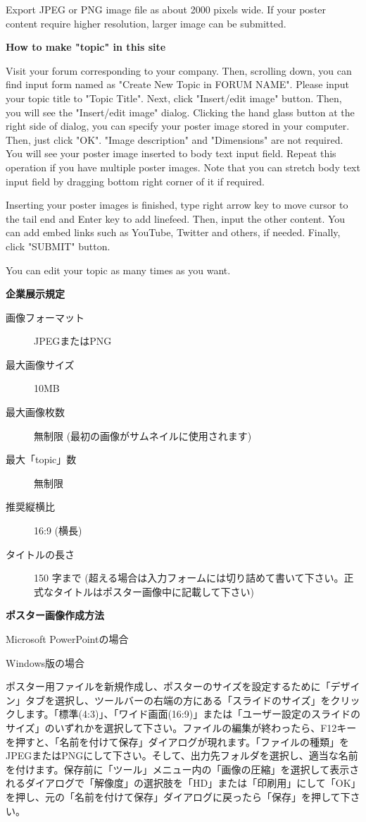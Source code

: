 \documentclass[titlepage,10pt,a4paper,uplatex]{jsbook}
\newenvironment{content}{\begin{shaded}\vspace{-1em}\raggedright\ttfamily\footnotesize\setlength{\baselineskip}{1.4em}}{\end{shaded}\vspace{-1em}}
\renewcommand{\textbf}[1]{{\bfseries\sffamily#1}}
\begin{document}
\begin{content}
Export JPEG or PNG image file as about 2000 pixels wide. If your poster content require higher resolution, larger image can be submitted.

\textbf{\Large How to make "topic" in this site}

Visit your forum corresponding to your company. Then, scrolling down, you can find input form named as "Create New Topic in FORUM NAME". Please input your topic title to "Topic Title". Next, click "Insert/edit image" button. Then, you will see the "Insert/edit image" dialog. Clicking the hand glass button at the right side of dialog, you can specify your poster image stored in your computer. Then, just click "OK". "Image description" and "Dimensions" are not required. You will see your poster image inserted to body text input field. Repeat this operation if you have multiple poster images. Note that you can stretch body text input field by dragging bottom right corner of it if required.

Inserting your poster images is finished, type right arrow key to move cursor to the tail end and Enter key to add linefeed. Then, input the other content. You can add embed links such as YouTube, Twitter and others, if needed. Finally, click "SUBMIT" button.

You can edit your topic as many times as you want.

\textbf{\Large 企業展示規定}

\begin{description}
\item[画像フォーマット] JPEGまたはPNG
\item[最大画像サイズ] 10MB
\item[最大画像枚数] 無制限 (最初の画像がサムネイルに使用されます)
\item[最大「topic」数] 無制限
\item[推奨縦横比] 16:9 (横長)
\item[タイトルの長さ] 150 字まで (超える場合は入力フォームには切り詰めて書いて下さい。正式なタイトルはポスター画像中に記載して下さい)
\end{description}

\textbf{\Large ポスター画像作成方法}

{\Large Microsoft PowerPointの場合}

{\large Windows版の場合}

ポスター用ファイルを新規作成し、ポスターのサイズを設定するために「デザイン」タブを選択し、ツールバーの右端の方にある「スライドのサイズ」をクリックします。「標準(4:3)」、「ワイド画面(16:9)」または「ユーザー設定のスライドのサイズ」のいずれかを選択して下さい。ファイルの編集が終わったら、F12キーを押すと、「名前を付けて保存」ダイアログが現れます。「ファイルの種類」をJPEGまたはPNGにして下さい。そして、出力先フォルダを選択し、適当な名前を付けます。保存前に「ツール」メニュー内の「画像の圧縮」を選択して表示されるダイアログで「解像度」の選択肢を「HD」または「印刷用」にして「OK」を押し、元の「名前を付けて保存」ダイアログに戻ったら「保存」を押して下さい。


\end{content}
\end{document}

